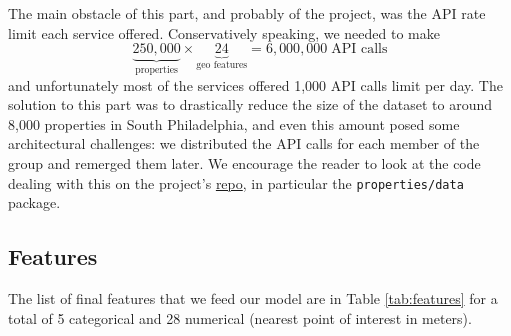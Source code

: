 \documentclass[11pt,a4paper]{article}
\begin{document}
\medskip

The main obstacle of this part, and probably of the project,
was the API rate limit each service offered. Conservatively
speaking, we needed to make
$$
\underbrace{250,000}_{\text{properties}} \times
\underbrace{24}_{\text{geo features}} = 6,000,000 \; \text{API calls}
$$
and unfortunately most of the services offered 1,000 API
calls limit per day. The solution to this part was to
drastically reduce the size of the dataset to around
8,000 properties in South Philadelphia, and even this
amount posed some architectural challenges: we distributed
the API calls for each member of the group and remerged them later. We encourage the reader to look at the code dealing
with this on the project's \href{https://github.com/nachonavarro/real-estate-ml}{repo}, in particular 
the \texttt{properties/data} package.

\subsection{Features}

The list of final features that we feed our model are in
Table \ref{tab:features} for a total of 5 categorical
and 28 numerical (nearest point of interest in meters).
\end{document}
